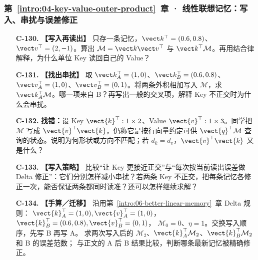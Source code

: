 \subsubsection*{第~\ref*{intro:04-key-value-outer-product}~章 · 线性联想记忆：写入、串扰与误差修正}
\begin{enumerate}[label={},leftmargin=4.8em,itemsep=4pt]
\item[\textbf{C-130.}] \leavevmode{}\label{exercise:C-130}\label{exercise:memory-single-write}\textbf{【写入再读出】} 只存一条记忆，$\vect k^\top=(0.6,0.8)$、$\vect v^\top=(2,-1)$。算出 $\mathcal{M}=\vect k\vect v^\top$ 与 $\vect k^\top\mathcal{M}$。再用结合律解释，为什么单位 Key 读回自己的 Value？
\item[\textbf{C-131.}] \leavevmode{}\label{exercise:C-131}\label{exercise:memory-cross-talk}\textbf{【找出串扰】} 取 $\vect k_A^\top=(1,0)$、$\vect k_B^\top=(0.6,0.8)$、$\vect v_A^\top=(1,0)$、$\vect v_B^\top=(0,1)$。将两条外积相加写入 $\mathcal{M}$，求 $\vect k_A^\top\mathcal{M}$。哪一项来自 B？再写出一般的交叉项，解释 Key 不正交时为什么会串扰。
\item[\textbf{C-132.}] \leavevmode{}\label{exercise:C-132}\label{exercise:memory-outer-shape}\textbf{找错：}设 Key $\vect{k}^\top:1\times2$、Value $\vect{v}^\top:1\times3$。同学把 $\mathcal{M}$ 写成 $\vect{v}^\top\vect{k}$，仍称它是按行向量约定可供 $\vect{q}^\top\mathcal{M}$ 查询的状态。说明为何形状或方向不匹配；若 $d_k=d_v$，$\vect{v}^\top\vect{k}$ 又是什么？
\item[\textbf{C-133.}] \leavevmode{}\label{exercise:C-133}\label{exercise:memory-write-strategies}\textbf{【写入策略】} 比较“让 Key 更接近正交”与“每次按当前读出误差做 Delta 修正”：它们分别怎样减小串扰？若两条 Key 不正交，把每条记忆各修正一次，能否保证两条都同时读准？还可以怎样继续求解？
\item[\textbf{C-134.}] \leavevmode{}\label{exercise:C-134}\label{exercise:delta-write-order}\label{exercise:delta-reverse}
\textbf{【手算／迁移】} 沿用第~\ref*{intro:06-better-linear-memory}~章 Delta 规则：
$\vect{k}_A^\top=(1,0),\vect{v}_A^\top=(1,0)$，$\vect{k}_B^\top=(0.6,0.8),\vect{v}_B^\top=(0,1)$，
$\mathcal{M}_0=0$、$\eta=1$。交换写入顺序，先写 B 再写 A。
求两次写入后的 $\mathcal{M}_2$、$\vect{k}_A^\top\mathcal{M}_2$、$\vect{k}_B^\top\mathcal{M}_2$ 和 B 的误差范数；
与正文的 A 后 B 结果比较，判断哪条最新记忆被精确修正。
\end{enumerate}
